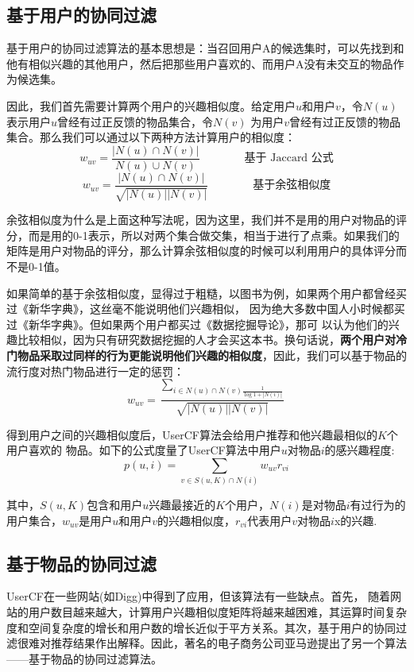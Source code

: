 \documentclass[12pt]{article}
\begin{document}
\subsection{基于用户的协同过滤}
基于用户的协同过滤算法的基本思想是：当召回用户A的候选集时，可以先找到和他有相似兴趣的其他用户，然后把那些用户喜欢的、而用户A没有未交互的物品作为候选集。

因此，我们首先需要计算两个用户的兴趣相似度。给定用户$u$和用户$v$，令$N(u)$表示用户$u$曾经有过正反馈的物品集合，令$N(v)$ 为用户$v$曾经有过正反馈的物品集合。那么我们可以通过以下两种方法计算用户的相似度：
$$
w_{uv} = \frac{|N(u) \cap N(v)|}{N(u) \cup N(v)} \qquad \qquad \text{基于 Jaccard 公式}
$$
$$
w_{uv} = \frac{|N(u) \cap N(v)|}{\sqrt{|N(u)| |N(v)|}} \qquad \qquad \text{基于余弦相似度}
$$

余弦相似度为什么是上面这种写法呢，因为这里，我们并不是用的用户对物品的评分，而是用的0-1表示，所以对两个集合做交集，相当于进行了点乘。如果我们的矩阵是用户对物品的评分，那么计算余弦相似度的时候可以利用用户的具体评分而不是0-1值。

如果简单的基于余弦相似度，显得过于粗糙，以图书为例，如果两个用户都曾经买过《新华字典》，这丝毫不能说明他们兴趣相似， 因为绝大多数中国人小时候都买过《新华字典》。但如果两个用户都买过《数据挖掘导论》，那可 以认为他们的兴趣比较相似，因为只有研究数据挖掘的人才会买这本书。换句话说，\textbf{两个用户对冷门物品采取过同样的行为更能说明他们兴趣的相似度}，因此，我们可以基于物品的流行度对热门物品进行一定的惩罚：
$$
w_{uv} = \frac{\sum_{i \in N(u)\cap N(v)\frac{1}{\log 1 + |N(i)|}}}{\sqrt{|N(u)| |N(v)|}}
$$

得到用户之间的兴趣相似度后，UserCF算法会给用户推荐和他兴趣最相似的$K$个用户喜欢的 物品。如下的公式度量了UserCF算法中用户$u$对物品$i$的感兴趣程度:
$$
p(u,i) = \sum_{v \in S(u,K) \cap N(i)} w_{uv}r_{vi}
$$

其中，$S(u, K)$包含和用户$u$兴趣最接近的$K$个用户，$N(i)$是对物品$i$有过行为的用户集合，$w_{uv}$是用户$u$和用户$v$的兴趣相似度，$r_{vi}$代表用户$v$对物品$i$x的兴趣.


\subsection{基于物品的协同过滤}
UserCF在一些网站(如Digg)中得到了应用，但该算法有一些缺点。首先， 随着网站的用户数目越来越大，计算用户兴趣相似度矩阵将越来越困难，其运算时间复杂度和空间复杂度的增长和用户数的增长近似于平方关系。其次，基于用户的协同过滤很难对推荐结果作出解释。因此，著名的电子商务公司亚马逊提出了另一个算法——基于物品的协同过滤算法。
\end{document}

